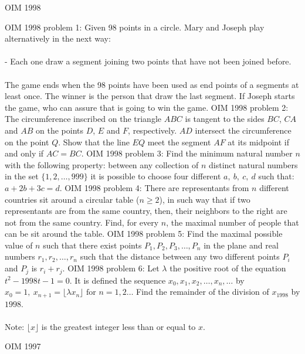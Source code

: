 OIM 1998 

OIM 1998 problem 1:  Given 98 points in a circle. Mary and Joseph play alternatively in the next way: \\\\
- Each one draw a segment joining two points that have not been  joined before. \\\\
The game ends when the 98 points have been used as end points of a segments at least once.  The winner is the person that draw the last segment. If Joseph starts the game, who can assure that is going to win the game. 
OIM 1998 problem 2:  The circumference inscribed on the triangle $ABC$ is tangent to the sides $BC$, $CA$ and $AB$ on the points $D$, $E$ and $F$, respectively. $AD$ intersect the circumference on the point $Q$. Show that the line $EQ$ meet the segment $AF$ at its midpoint if and only if $AC=BC$. 
OIM 1998 problem 3:  Find the minimum natural number $n$ with the following property: between any collection of $n$ distinct natural numbers in the set $\{1,2, \dots,999\}$ it is possible to choose four different $a,\ b,\ c,\ d$ such that: $a + 2b + 3c = d$. 
OIM 1998 problem 4:  There are representants from $n$ different countries sit around a circular table ($n\geq2$), in such way that if two representants are from the same country, then, their neighbors to the right are not from the same country. Find, for every $n$, the maximal number of people that can be sit around the table. 
OIM 1998 problem 5:  Find the maximal possible value of $n$ such that there exist points $P_1,P_2,P_3,\ldots,P_n$ in the plane and real numbers $r_1,r_2,\ldots,r_n$ such that the distance between any two different points $P_i$ and $P_j$ is $r_i+r_j$. 
OIM 1998 problem 6:  Let $\lambda$ the positive root of the equation $t^2-1998t-1=0$.  It is defined the sequence $x_0,x_1,x_2,\ldots,x_n,\ldots$ by $x_0=1,\ x_{n+1}=\lfloor\lambda{x_n}\rfloor\mbox{ for }n=1,2\ldots$ Find the remainder of the division of $x_{1998}$ by $1998$. \\\\
Note: $\lfloor{x}\rfloor$ is the greatest integer less than or equal to $x$. 

OIM 1997 

